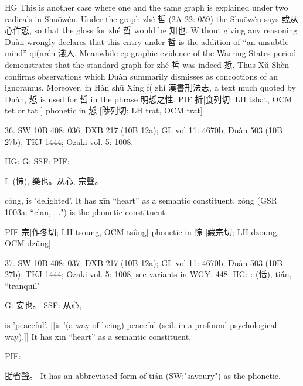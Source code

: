 HG This is another case where one and the same graph is explained under two radicals in Shuōwén. Under the graph zhé 哲 (2A 22: 059) the Shuōwén says 或从心作悊, so that the gloss for zhé 哲 would be 知也. Without giving any reasoning Duàn wrongly declares that this entry under 哲 is the addition of ``an unsubtle mind'' qi(nrén 淺人. Meanwhile epigraphic evidence of the Warring States period demonstrates that the standard graph for zhé 哲 was indeed 悊. Thus Xǔ Shèn confirms observations which Duàn summarily dismisses as concoctions of an ignoramus. Moreover, in Hàn shū Xíng f( zhì 漢書刑法志, a text much quoted by Duàn, 悊 is used for 哲 in the phrase 明悊之性.
PIF    折[食列切; LH tshat, OCM tet or tat ] phonetic in 悊 [陟列切; LH trat, OCM trat]

36. SW 10B 408: 036; DXB 217 (10B 12a); GL vol 11: 4670b; Duàn 503 (10B 27b); TKJ 1444; Ozaki vol. 5: 1008.


HG:
G: SSF: PIF:

L (悰),
樂也。从心, 宗聲。

cóng,
is 'delighted'.
It has xīn ``heart'' as a semantic constituent,
zǒng (GSR 1003a: ``clan, ...") is the phonetic constituent.

PIF     宗[作冬切; LH tsoung, OCM tsûng] phonetic in 悰 [藏宗切; LH dzoung, OCM dzûng]

37. SW 10B 408: 037; DXB 217 (10B 12a); GL vol 11: 4670b; Duàn 503 (10B 27b); TKJ 1444; Ozaki vol. 5: 1008, see
variants in WGY: 448.
HG: : (恬), tián, ``tranquil"




G:	安也。
SSF: 从心,

is 'peaceful'. [[is '(a way of being) peaceful (scil. in a profound psychological way).]]
It has xīn ``heart'' as a semantic constituent,

PIF:

甛省聲。 It has an abbreviated form of tián (SW:"savoury") as the phonetic.

